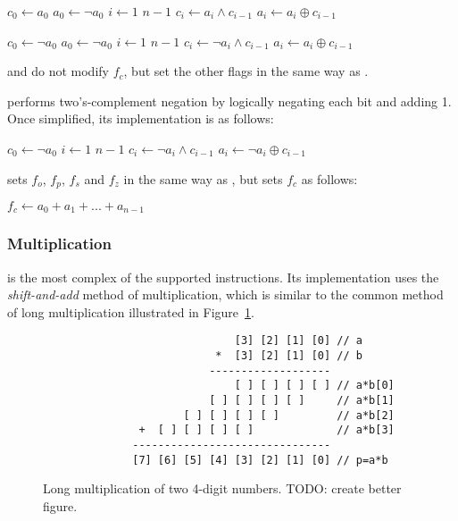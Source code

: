 \documentclass[a4paper,11pt]{kth-mag}
\renewcommand{\gets}{\leftarrow}
\newcommand{\AND}{\land}
\newcommand{\XOR}{\oplus}
\newcommand{\NOT}{\lnot}
\begin{document}
\begin{codebox}
\zi $c_0 \gets a_0$
\zi $a_0 \gets \NOT a_0$
\zi \For $i \gets 1$ \To $n-1$
\zi \Do
      $c_i \gets a_i \AND c_{i-1}$
\zi   $a_i \gets a_i \XOR c_{i-1}$
    \End
\end{codebox}

\begin{codebox}
\zi $c_0 \gets \NOT a_0$
\zi $a_0 \gets \NOT a_0$
\zi \For $i \gets 1$ \To $n-1$
\zi \Do
      $c_i \gets \NOT a_i \AND c_{i-1}$
\zi   $a_i \gets a_i \XOR c_{i-1}$
    \End
\end{codebox}

 and  do not modify $f_c$, but set the other flags in the same way as .

 performs two's-complement negation by logically negating each bit and adding 1.
Once simplified, its implementation is as follows:

\begin{codebox}
\zi $c_0 \gets \NOT a_0$
\zi \For $i \gets 1$ \To $n-1$
\zi \Do
      $c_i \gets \NOT a_i \AND c_{i-1}$
\zi   $a_i \gets \NOT a_i \XOR c_{i-1}$
    \End
\end{codebox}

 sets $f_o$, $f_p$, $f_s$ and $f_z$ in the same way as , but sets $f_c$ as follows:

\begin{codebox}
\zi $f_c \gets a_0 + a_1 + ... + a_{n-1}$
\end{codebox}

\subsubsection{Multiplication}

 is the most complex of the supported instructions.
Its implementation uses the \emph{shift-and-add} method of multiplication, which is similar to the common method of long multiplication illustrated in Figure~\ref{fig:long_multiplication}.

\begin{figure}
\centering
\begin{verbatim}
                              [3] [2] [1] [0] // a
                           *  [3] [2] [1] [0] // b
                          -------------------
                              [ ] [ ] [ ] [ ] // a*b[0]
                          [ ] [ ] [ ] [ ]     // a*b[1]
                      [ ] [ ] [ ] [ ]         // a*b[2]
               +  [ ] [ ] [ ] [ ]             // a*b[3]
              -------------------------------
              [7] [6] [5] [4] [3] [2] [1] [0] // p=a*b
\end{verbatim}
\caption{Long multiplication of two 4-digit numbers. TODO: create better figure.}
\label{fig:long_multiplication}
\end{figure}
\end{document}

